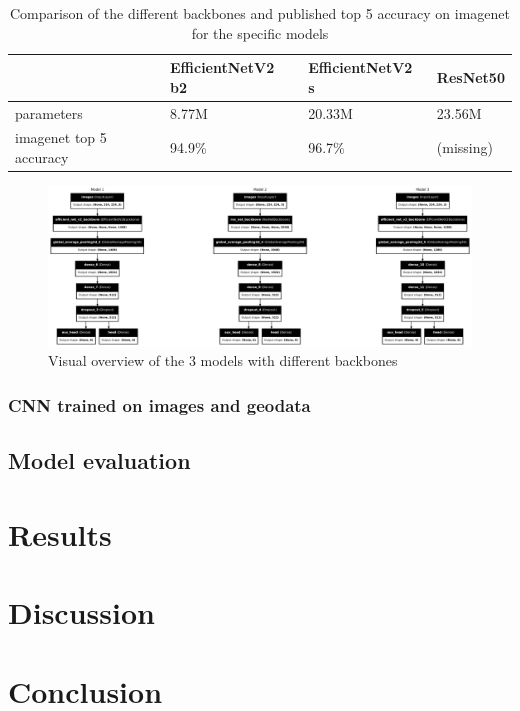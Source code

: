 \documentclass[12pt,a4paper,oneside]{article}
\begin{document}
\begin{table}[!h]
    
    \centering
    \begin{tabular}{@{}llll@{}}
    \toprule
    & EfficientNetV2 b2 & EfficientNetV2 s & ResNet50 \\ \midrule
    parameters              & 8.77M             & 20.33M           & 23.56M   \\
    imagenet top 5 accuracy & 94.9\%            & 96.7\%           & (missing)       \\ \bottomrule
\end{tabular}
\caption{Comparison of the different backbones and published top 5 accuracy on imagenet for the specific models}
\label{tab:backbone_comparison}
\end{table}

\begin{figure}[!h]
    \centering
    \includegraphics[width=1\textwidth]{assets/different_models.png}
    \caption{Visual overview of the 3 models with different backbones}
    \label{fig:models_overview}
\end{figure}

\subsubsection{CNN trained on images and geodata}

\subsection{Model evaluation}



\section{Results}

\section{Discussion}

\section{Conclusion}

\printbibliography
\end{document}
